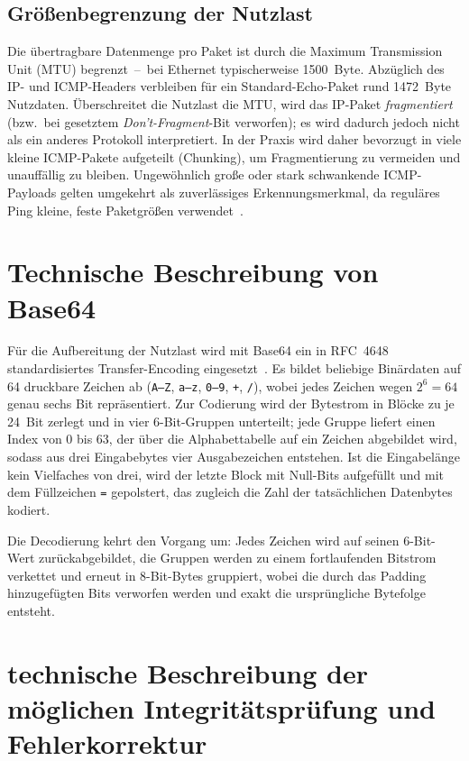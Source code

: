 \documentclass[11pt,a4paper]{article}
\begin{document}
\subsection{Größenbegrenzung der Nutzlast}
Die übertragbare Datenmenge pro Paket ist durch die Maximum Transmission Unit
(MTU) begrenzt~--~bei Ethernet typischerweise 1500~Byte. Abzüglich des IP- und
ICMP-Headers verbleiben für ein Standard-Echo-Paket rund 1472~Byte Nutzdaten.
Überschreitet die Nutzlast die MTU, wird das IP-Paket \emph{fragmentiert} (bzw.\
bei gesetztem \emph{Don't-Fragment}-Bit verworfen); es wird dadurch jedoch nicht
als ein anderes Protokoll interpretiert. In der Praxis wird daher bevorzugt in
viele kleine ICMP-Pakete aufgeteilt (Chunking), um Fragmentierung zu vermeiden
und unauffällig zu bleiben. Ungewöhnlich große oder stark schwankende
ICMP-Payloads gelten umgekehrt als zuverlässiges Erkennungsmerkmal, da reguläres
Ping kleine, feste Paketgrößen verwendet~\cite{elastic}.

\section{Technische Beschreibung von Base64}

Für die Aufbereitung der Nutzlast wird mit Base64 ein in RFC~4648
standardisiertes Transfer-Encoding eingesetzt~\cite{rfc4648}. Es bildet
beliebige Binärdaten auf 64 druckbare Zeichen ab (\texttt{A--Z},
\texttt{a--z}, \texttt{0--9}, \texttt{+}, \texttt{/}), wobei jedes Zeichen
wegen $2^{6}=64$ genau sechs Bit repräsentiert. Zur Codierung wird der
Bytestrom in Blöcke zu je 24~Bit zerlegt und in vier 6-Bit-Gruppen
unterteilt; jede Gruppe liefert einen Index von 0 bis 63, der über die
Alphabettabelle auf ein Zeichen abgebildet wird, sodass aus drei
Eingabebytes vier Ausgabezeichen entstehen. Ist die Eingabelänge kein
Vielfaches von drei, wird der letzte Block mit Null-Bits aufgefüllt und
mit dem Füllzeichen \texttt{=} gepolstert, das zugleich die Zahl der
tatsächlichen Datenbytes kodiert.

Die Decodierung kehrt den Vorgang um: Jedes Zeichen wird auf seinen
6-Bit-Wert zurückabgebildet, die Gruppen werden zu einem fortlaufenden
Bitstrom verkettet und erneut in 8-Bit-Bytes gruppiert, wobei die durch
das Padding hinzugefügten Bits verworfen werden und exakt die
ursprüngliche Bytefolge entsteht.

\section{technische Beschreibung der möglichen Integritätsprüfung und Fehlerkorrektur}
\end{document}
